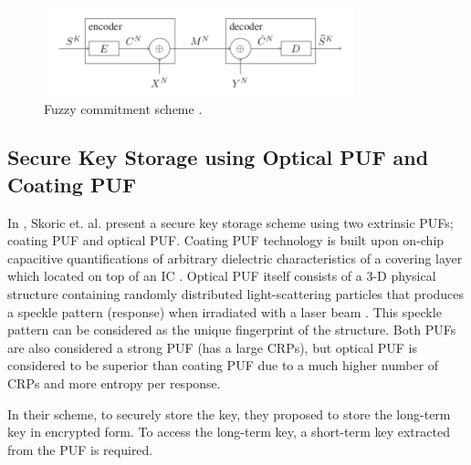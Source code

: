 \begin{figure}[tph!]
    \centerline{\includegraphics[width={0.8\textwidth}]{images/fuzzy_commitment}}
    \caption{Fuzzy commitment scheme \cite{8006840}.}
    \label{fig:fuzzy_commitment}
\end{figure}


\subsection{Secure Key Storage using Optical PUF and Coating PUF}
In \cite{Skoric2007}, Skoric et. al. present a secure key storage scheme using two extrinsic PUFs; coating PUF and optical PUF. Coating PUF technology is built upon on-chip capacitive quantifications of arbitrary dielectric characteristics of a covering layer which located on top of an IC \cite{10.1007/11894063_29}.  Optical PUF itself consists of a 3-D physical structure containing randomly distributed light-scattering particles that produces a speckle pattern (response) when irradiated with a laser beam \cite{Skoric2007}. This speckle pattern can be considered as the unique fingerprint of the structure. Both PUFs are also considered a strong PUF (has a large CRPs), but optical PUF is considered to be superior than coating PUF due to a much higher number of CRPs and more entropy per response.

In their scheme, to securely store the key, they proposed to store the long-term key in encrypted form. To access the long-term key, a short-term key extracted from the PUF is required.

